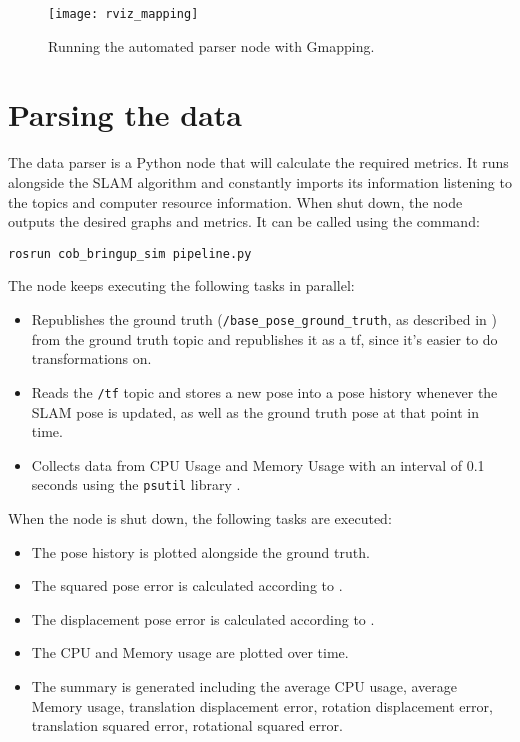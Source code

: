 \begin{figure}[!ht]
    \centering
    \texttt{[image: rviz\_mapping]}
    \caption{Running the automated parser node with Gmapping.}
    \label{fig:rviz_mapping}
\end{figure}

\section{Parsing the data}

The data parser is a Python node that will calculate the required metrics. It runs alongside the SLAM algorithm and constantly imports its information listening to the topics and computer resource information. When shut down, the node outputs the desired graphs and metrics. It can be called using the command:

\begin{verbatim}
rosrun cob_bringup_sim pipeline.py
\end{verbatim}

The node keeps executing the following tasks in parallel:

\begin{itemize}
    \item Republishes the ground truth (\texttt{/base\_pose\_ground\_truth}, as described in ) from the ground truth topic and republishes it as a tf, since it's easier to do transformations on. 
    \item Reads the \texttt{/tf} topic and stores a new pose into a pose history whenever the SLAM pose is updated, as well as the ground truth pose at that point in time.
    \item Collects data from CPU Usage and Memory Usage with an interval of 0.1 seconds using the \texttt{psutil} library \cite{psutil}.
\end{itemize}

When the node is shut down, the following tasks are executed:

\begin{itemize}
    \item The pose history is plotted alongside the ground truth.
    \item The squared pose error is calculated according to .
    \item The displacement pose error is calculated according to .
    \item The CPU and Memory usage are plotted over time.
    \item The summary is generated including the average CPU usage, average Memory usage, translation displacement error, rotation displacement error, translation squared error, rotational squared error.
\end{itemize}

